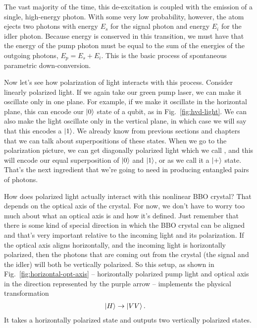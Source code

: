 The vast majority of the time, this de-excitation is coupled with the emission of a single, high-energy photon. With some very low probability, however, the atom ejects two photons with energy $E_s$ for the signal photon and energy $E_i$ for the idler photon. Because energy is conserved in this transition, we must have that the energy of the pump photon must be equal to the sum of the energies of the outgoing photons, $E_p = E_s + E_i$. This is the basic process of spontaneous parametric down-conversion.

Now let's see how polarization of light interacts with this process. Consider linearly polarized light. If we again take our green pump laser, we can make it oscillate only in one plane. For example, if we make it oscillate in the horizontal plane, this can encode our $\left| 0 \right\rangle$ state of a qubit, as in Fig.~\ref{fig:hvd-light}. We can also make the light oscillate only in the vertical plane, in which case we will say that this encodes a $\left| 1 \right\rangle$. We already know from previous sections and chapters that we can talk about superpositions of these states. When we go to the polarization picture, we can get diagonally polarized light which we call , and this will encode our equal superposition of $\left| 0 \right\rangle$ and $\left| 1 \right\rangle$, or as we call it a $\left| + \right\rangle$ state. That's the next ingredient that we're going to need in producing entangled pairs of photons.

How does polarized light actually interact with this nonlinear BBO crystal? That depends on the optical axis of the crystal. For now, we don't have to worry too much about what an optical axis is and how it's defined. Just remember that there is some kind of special direction in which the BBO crystal can be aligned and that's very important relative to the incoming light and its polarization. If the optical axis aligns horizontally, and the incoming light is horizontally polarized, then the photons that are coming out from the crystal (the signal and the idler) will both be vertically polarized. So this setup, as shown in Fig.~\ref{fig:horizontal-opt-axis} -- horizontally polarized pump light and optical axis in the direction represented by the purple arrow -- implements the physical transformation
\begin{equation}
\begin{aligned}
\left| H \right\rangle &\rightarrow \left| VV \right\rangle.
\end{aligned}
\end{equation}
It takes a horizontally polarized state and outputs two vertically polarized states.

